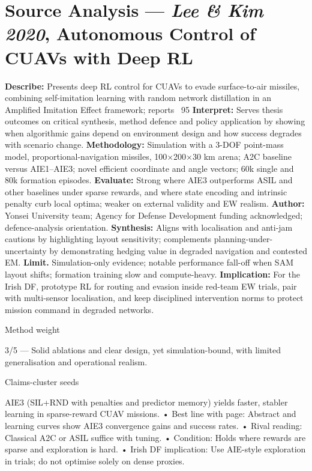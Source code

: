 \section*{Source Analysis — \textit{Lee & Kim 2020}, Autonomous Control of CUAVs with Deep RL}
\textbf{Describe:} Presents deep RL control for CUAVs to evade surface-to-air missiles, combining self-imitation learning with random network distillation in an Amplified Imitation Effect framework; reports ~95%
\textbf{Interpret:} Serves thesis outcomes on critical synthesis, method defence and policy application by showing when algorithmic gains depend on environment design and how success degrades with scenario change.
\textbf{Methodology:} Simulation with a 3-DOF point-mass model, proportional-navigation missiles, 100×200×30 km arena; A2C baseline versus AIE1–AIE3; novel efficient coordinate and angle vectors; 60k single and 80k formation episodes.
\textbf{Evaluate:} Strong where AIE3 outperforms ASIL and other baselines under sparse rewards, and where state encoding and intrinsic penalty curb local optima; weaker on external validity and EW realism.
\textbf{Author:} Yonsei University team; Agency for Defense Development funding acknowledged; defence-analysis orientation.
\textbf{Synthesis:} Aligns with localisation and anti-jam cautions by highlighting layout sensitivity; complements planning-under-uncertainty by demonstrating hedging value in degraded navigation and contested EM.
\textbf{Limit.} Simulation-only evidence; notable performance fall-off when SAM layout shifts; formation training slow and compute-heavy.
\textbf{Implication:} For the Irish DF, prototype RL for routing and evasion inside red-team EW trials, pair with multi-sensor localisation, and keep disciplined intervention norms to protect mission command in degraded networks.

Method weight

3/5 — Solid ablations and clear design, yet simulation-bound, with limited generalisation and operational realism.

Claims-cluster seeds

AIE3 (SIL+RND with penalties and predictor memory) yields faster, stabler learning in sparse-reward CUAV missions.
• Best line with page: Abstract and learning curves show AIE3 convergence gains and success rates.
• Rival reading: Classical A2C or ASIL suffice with tuning.
• Condition: Holds where rewards are sparse and exploration is hard.
• Irish DF implication: Use AIE-style exploration in trials; do not optimise solely on dense proxies.

